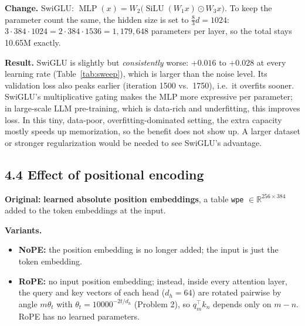 \documentclass[11pt]{article}
\begin{document}
\textbf{Change.} SwiGLU: $\operatorname{MLP}(x)=W_2\big(\operatorname{SiLU}(W_1x)\odot W_3x\big)$. To keep the parameter count the same, the hidden size is set to $\tfrac{8}{3}d=1024$: $3\cdot384\cdot1024=2\cdot384\cdot1536=1{,}179{,}648$ parameters per layer, so the total stays 10.65M exactly.

\begin{center}\end{center}

\textbf{Result.} SwiGLU is slightly but \emph{consistently} worse: $+0.016$ to $+0.028$ at every learning rate (Table~\ref{tab:sweep}), which is larger than the noise level. Its validation loss also peaks earlier (iteration 1500 vs.\ 1750), i.e.\ it overfits sooner. SwiGLU's multiplicative gating makes the MLP more expressive per parameter; in large-scale LLM pre-training, which is data-rich and underfitting, this improves loss. In this tiny, data-poor, overfitting-dominated setting, the extra capacity mostly speeds up memorization, so the benefit does not show up. A larger dataset or stronger regularization would be needed to see SwiGLU's advantage.

\subsection*{4.4 Effect of positional encoding}
\textbf{Original:} \textbf{learned absolute position embeddings}, a table \texttt{wpe} $\in\mathbb{R}^{256\times384}$ added to the token embeddings at the input.

\textbf{Variants.}
\begin{itemize}[leftmargin=1.5em]
\item \textbf{NoPE:} the position embedding is no longer added; the input is just the token embedding.
\item \textbf{RoPE:} no input position embedding; instead, inside every attention layer, the query and key vectors of each head ($d_h=64$) are rotated pairwise by angle $m\theta_t$ with $\theta_t=10000^{-2t/d_h}$ (Problem 2), so $q_m^{\top}k_n$ depends only on $m-n$. RoPE has no learned parameters.
\end{itemize}

\begin{center}\end{center}
\end{document}
